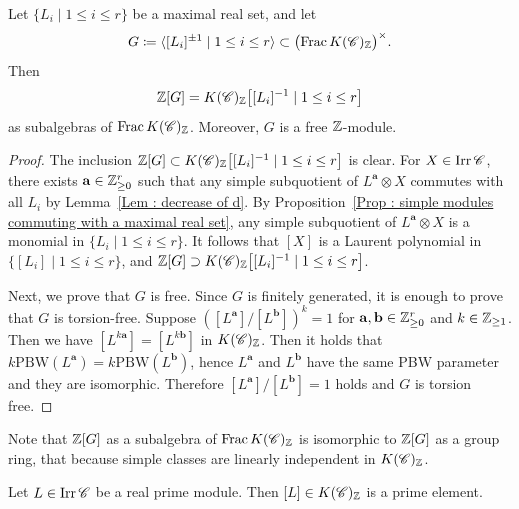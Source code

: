 \begin{Lem}
\label{Lem : localization at a maximal real set}
Let $\{L_i \mid 1 \leq i \leq r\}$ be a maximal real set, and let
\[
G \coloneq
\langle [L_i]^{\pm 1} \mid 1 \leq i \leq r \rangle
\subset \bigl(\operatorname{Frac} K(\mathscr{C})_{\mathbb{Z}}\bigr)^\times.
\]
Then
\[
\mathbb{Z}[G] = K(\mathscr{C})_{\mathbb{Z}}
\bigl[[L_i]^{-1} \mid 1 \leq i \leq r\bigr]
\]
as subalgebras of $\operatorname{Frac} K(\mathscr{C})_{\mathbb{Z}}$.
Moreover, $G$ is a free $\mathbb{Z}$-module.
\end{Lem}

\begin{proof}
The inclusion
$\mathbb{Z}[G] \subset K(\mathscr{C})_{\mathbb{Z}}
\bigl[[L_i]^{-1} \mid 1 \leq i \leq r\bigr]$
is clear.
For $X \in \mathop{\mathrm{Irr}}\nolimits\mathscr{C}$,
there exists $\mathbf{a} \in \mathbb{Z}_{\geq 0}^r$
such that any simple subquotient of $L^{\mathbf{a}} \otimes X$
commutes with all $L_i$ by Lemma~\ref{Lem : decrease of d}.
By Proposition~\ref{Prop : simple modules commuting with a maximal real set},
any simple subquotient of $L^{\mathbf{a}} \otimes X$
is a monomial in $\{L_i \mid 1 \leq i \leq r\}$.
It follows that $[X]$ is a Laurent polynomial in
$\{[L_i] \mid 1 \leq i \leq r\}$, and
$\mathbb{Z}[G] \supset K(\mathscr{C})_{\mathbb{Z}}
\bigl[[L_i]^{-1} \mid 1 \leq i \leq r\bigr]$.

Next, we prove that $G$ is free.
Since $G$ is finitely generated,
it is enough to prove that $G$ is torsion-free.
Suppose $([L^{\mathbf{a}}]/[L^{\mathbf{b}}])^k = 1$ for $\mathbf{a}, \mathbf{b} \in \mathbb{Z}_{\geq 0}^r$ and 
$k \in \mathbb{Z}_{\geq 1}$. 
Then we have $[L^{k\mathbf{a}}] = [L^{k\mathbf{b}}]$ in $K(\mathscr{C})_{\mathbb{Z}}$. 
Then it holds that $k\mathrm{PBW}(L^{\mathbf{a}}) = k\mathrm{PBW}(L^{\mathbf{b}})$, 
hence $L^{\mathbf{a}}$ and $L^{\mathbf{b}}$ have the same PBW parameter and they are isomorphic. 
Therefore $[L^{\mathbf{a}}]/[L^{\mathbf{b}}] = 1$ holds and 
$G$ is torsion free. 
\end{proof}
Note that $\mathbb{Z}[G]$ as a subalgebra of $\operatorname{Frac} K(\mathscr{C})_{\mathbb{Z}}$ is 
isomorphic to $\mathbb{Z}[G]$ as a group ring, 
that because simple classes are linearly independent in $K(\mathscr{C})_{\mathbb{Z}}$. 


\begin{Prop}
\label{Prop : real prime modules give prime elements}
Let $L \in \mathop{\mathrm{Irr}}\nolimits\mathscr{C}$ be a real prime module.
Then $[L] \in K(\mathscr{C})_{\mathbb{Z}}$ is a prime element.
\end{Prop}

